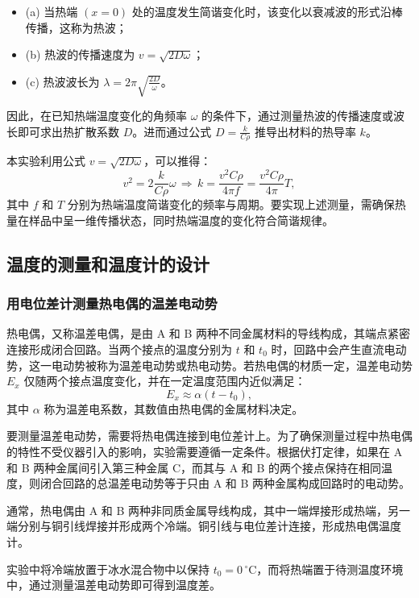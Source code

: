 \documentclass[UTF-8,twoside,cs4size]{ctexart}
\begin{document}
\begin{itemize}
    \item \kaishu (a) 当热端 $(x=0)$ 处的温度发生简谐变化时，该变化以衰减波的形式沿棒传播，这称为热波；
    \item \kaishu (b) 热波的传播速度为 $v = \sqrt{2D\omega}$；
    \item \kaishu (c) 热波波长为 $\lambda = 2\pi\sqrt{\frac{2D}{\omega}}$。
\end{itemize}

因此，在已知热端温度变化的角频率 $\omega$ 的条件下，通过测量热波的传播速度或波长即可求出热扩散系数 $D$。进而通过公式 $D=\frac{k}{C\rho}$ 推导出材料的热导率 $k$。

本实验利用公式 $v = \sqrt{2D\omega}$，可以推得：
\[
v^2 = 2\frac{k}{C\rho}\omega \,\Longrightarrow\, k = \frac{v^2C\rho}{4\pi f} = \frac{v^2C\rho}{4\pi} T,
\]
其中 $f$ 和 $T$ 分别为热端温度简谐变化的频率与周期。要实现上述测量，需确保热量在样品中呈一维传播状态，同时热端温度的变化符合简谐规律。

\subsection{温度的测量和温度计的设计}
\subsubsection{用电位差计测量热电偶的温差电动势}

热电偶，又称温差电偶，是由 A 和 B 两种不同金属材料的导线构成，其端点紧密连接形成闭合回路。当两个接点的温度分别为 $t$ 和 $t_0$ 时，回路中会产生直流电动势，这一电动势被称为温差电动势或热电动势。若热电偶的材质一定，温差电动势 $E_x$ 仅随两个接点温度变化，并在一定温度范围内近似满足：
\[
E_x \approx \alpha (t - t_0),
\]
其中 $\alpha$ 称为温差电系数，其数值由热电偶的金属材料决定。

要测量温差电动势，需要将热电偶连接到电位差计上。为了确保测量过程中热电偶的特性不受仪器引入的影响，实验需要遵循一定条件。根据伏打定律，如果在 A 和 B 两种金属间引入第三种金属 C，而其与 A 和 B 的两个接点保持在相同温度，则闭合回路的总温差电动势等于只由 A 和 B 两种金属构成回路时的电动势。

通常，热电偶由 A 和 B 两种非同质金属导线构成，其中一端焊接形成热端，另一端分别与铜引线焊接并形成两个冷端。铜引线与电位差计连接，形成热电偶温度计。

实验中将冷端放置于冰水混合物中以保持 $t_0 = 0 \, ^\circ \mathrm{C}$，而将热端置于待测温度环境中，通过测量温差电动势即可得到温度差。
\end{document}
